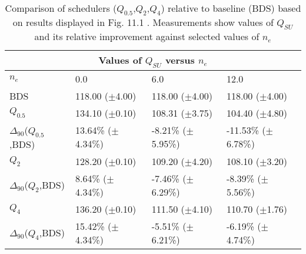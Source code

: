 \clearpage
\begin{landscape}
\begin{table}[h]
\begin{center}
\begin{tabular}{llll}
\toprule
\multicolumn{4}{c}{Values of $Q_{SU}$ versus $n_e$}\\
\midrule
$n_e$ & 0.0 & 6.0 & 12.0\\
\midrule
BDS &  118.00 ($\pm$4.00) &  118.00 ($\pm$4.00) &  118.00 ($\pm$4.00)\\
\midrule
$Q_{0.5}$ &  134.10 ($\pm$0.10) &  108.31 ($\pm$3.75) &  104.40 ($\pm$4.80)\\
$\Delta_{90}$($Q_{0.5}$,BDS) & 13.64\% ($\pm$4.34\%) & -8.21\% ($\pm$5.95\%) & -11.53\% ($\pm$6.78\%)\\
$Q_2$ &  128.20 ($\pm$0.10) &  109.20 ($\pm$4.20) &  108.10 ($\pm$3.20)\\
$\Delta_{90}$($Q_2$,BDS) & 8.64\% ($\pm$4.34\%) & -7.46\% ($\pm$6.29\%) & -8.39\% ($\pm$5.56\%)\\
$Q_4$ &  136.20 ($\pm$0.10) &  111.50 ($\pm$4.10) &  110.70 ($\pm$1.76)\\
$\Delta_{90}$($Q_4$,BDS) & 15.42\% ($\pm$4.34\%) & -5.51\% ($\pm$6.21\%) & -6.19\% ($\pm$4.74\%)\\
\bottomrule
\end{tabular}
\end{center}
\caption[Comparison of $Q_{SU}$ versus $n_e$ for $Q_{0.5}$,$Q_2$,$Q_4$ relative to BDS.]{Comparison of schedulers ($Q_{0.5}$,$Q_2$,$Q_4$) relative to baseline (BDS) based on results displayed in Fig. 11.1 . Measurements show values of $Q_{SU}$ and its relative improvement against selected values of $n_e$}
\label{b:f111}
\end{table}
\end{landscape}


